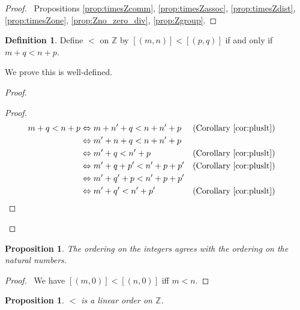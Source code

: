 \documentclass{book}
\let\qed\relax
\newtheorem{prop}[ax]{Proposition}
\theoremstyle{definition}
\newtheorem{df}[ax]{Definition}
\begin{document}
\begin{proof}
\pf\ Propositions \ref{prop:timesZcomm}, \ref{prop:timesZassoc}, \ref{prop:timesZdist}, \ref{prop:timesZone}, \ref{prop:Zno_zero_div}, \ref{prop:Zgroup}. \qed
\end{proof}

\begin{df}
Define $<$ on $\mathbb{Z}$ by $[(m,n)] < [(p,q)]$ if and only if $m + q < n + p$.

We prove this is well-defined.
\end{df}

\begin{proof}
\pf
{}
\begin{proof}
	\pf
	\begin{align*}
		m + q < n + p & \Leftrightarrow m + n' + q < n + n' + p & (\text{Corollary \ref{cor:pluslt}}) \\
		& \Leftrightarrow m' + n + q < n + n' + p \\
		& \Leftrightarrow m' + q < n' + p & (\text{Corollary \ref{cor:pluslt}}) \\
		& \Leftrightarrow m' + q + p' < n' + p + p' & (\text{Corollary \ref{cor:pluslt}}) \\
		& \Leftrightarrow m' + q' + p < n' + p + p' \\
		& \Leftrightarrow m' + q' < n' + p' & (\text{Corollary \ref{cor:pluslt}}) & \qed \\
	\end{align*}
\end{proof}
\end{proof}

\begin{prop}
The ordering on the integers agrees with the ordering on the natural numbers.
\end{prop}

\begin{proof}
\pf\ We have $[(m,0)] < [(n,0)]$ iff $m < n$. \qed
\end{proof}

\begin{prop}
$<$ is a linear order on $\mathbb{Z}$.
\end{prop}
\end{document}
